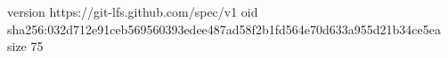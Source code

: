 version https://git-lfs.github.com/spec/v1
oid sha256:032d712e91ceb569560393edee487ad58f2b1fd564e70d633a955d21b34ce5ea
size 75
